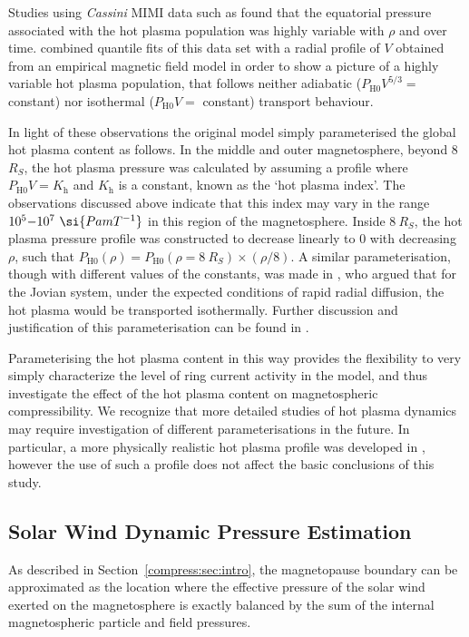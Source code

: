 Studies using \textit{Cassini} MIMI data such as \citet{sergis2007} found that the equatorial pressure associated with the hot plasma population was highly variable with $\rho$ and over time. \citet{achilleos2010a} combined quantile fits of this data set with a radial profile of $V$ obtained from an empirical magnetic field model \citep{bunce2007} in order to show a picture of a highly variable hot plasma population, that follows neither adiabatic ($P_\mathrm{H0}V^{5/3} =$ constant) nor isothermal ($P_\mathrm{H0}V =$ constant) transport behaviour.

In light of these observations the original \citet{achilleos2010a} model simply parameterised the global hot plasma content as follows. In the middle and outer magnetosphere, beyond 8 $\si{R_S}$, the hot plasma pressure was calculated by assuming a profile where $P_\mathrm{H0}V = K_\mathrm{h}$ and $K_\mathrm{h}$ is a constant, known as the `hot plasma index'. The observations discussed above indicate that this index may vary in the range $10^5{\--}10^7~\si{Pa m T^{-1}}$ in this region of the magnetosphere. Inside $\SI{8}{R_S}$, the hot plasma pressure profile was constructed to decrease linearly to 0 with decreasing $\rho$, such that $P_\mathrm{H0}(\rho) = P_\mathrm{H0}(\rho = \SI{8}{R_S})\times(\rho/8)$. A similar parameterisation, though with different values of the constants, was made in \citet{caudal1986}, who argued that for the Jovian system, under the expected conditions of rapid radial diffusion, the hot plasma would be transported isothermally. Further discussion and justification of this parameterisation can be found in \citet{achilleos2010a}.

Parameterising the hot plasma content in this way provides the flexibility to very simply characterize the level of ring current activity in the model, and thus investigate the effect of the hot plasma content on magnetospheric compressibility. We recognize that more detailed studies of hot plasma dynamics may require investigation of different parameterisations in the future. In particular, a more physically realistic hot plasma profile was developed in \citet{achilleos2010b}, however the use of such a profile does not affect the basic conclusions of this study.

\subsection{Solar Wind Dynamic Pressure Estimation}\label{compress:sec:pressurebalance}
As described in Section~\ref{compress:sec:intro}, the magnetopause boundary can be approximated as the location where the effective pressure of the solar wind exerted on the magnetosphere is exactly balanced by the sum of the internal magnetospheric particle and field pressures. 

